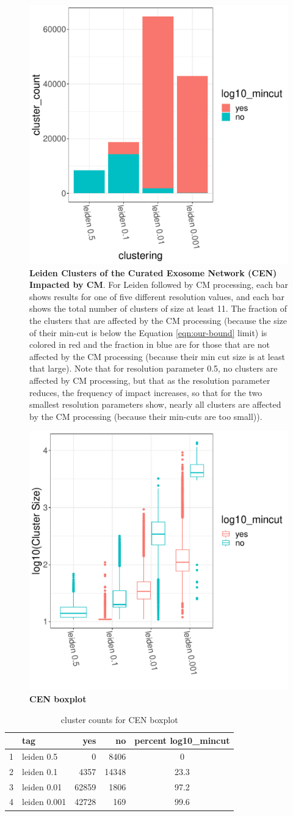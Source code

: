 \documentclass[11pt]{article}   	%
\begin{document}
\begin{figure}[H]
\centering
\includegraphics[width=0.4\linewidth]{figs/cen_istouched.pdf}
\caption{\textbf{Leiden Clusters of the Curated Exosome Network (CEN) Impacted by CM}. For Leiden followed by CM processing, each bar shows results for one of five different resolution values, and each bar shows
the total number of clusters of size at least 11. The fraction of the clusters that are affected by the CM processing (because the size of their min-cut is below the Equation \ref{eqn:our-bound} limit)
is colored in red and the fraction in blue are for those that are not affected by the CM processing (because their min cut size is at least that large).
Note that for resolution parameter 0.5, no clusters are affected by CM processing, but that as the resolution parameter reduces, the frequency of impact increases,
so that for the two smallest resolution parameters show, nearly all clusters are affected by the CM processing (because their min-cuts are too small)).}
\label{fig:cenistouched}
\end{figure}

\begin{figure}[H]
\centering
\includegraphics[width=0.4\linewidth]{figs/cen_boxplot.pdf}
\caption{\textbf{CEN boxplot}}
\label{fig:cenistouched}
\end{figure}

\begin{table}[ht]
\centering
\begin{tabular}{rlrrc}
  \hline
 & tag & yes & no & percent log10\_mincut\\ 
  \hline
1 & leiden 0.5 & 0  & 8406  & 0\\ 
  2 & leiden 0.1 & 4357 & 14348 & 23.3\\ 
  3 & leiden 0.01 & 62859 & 1806 & 97.2\\ 
  4 & leiden 0.001 & 42728 & 169 & 99.6 \\ 
   \hline
\end{tabular}
\caption{cluster counts for CEN boxplot}
\end{table}
\end{document}
